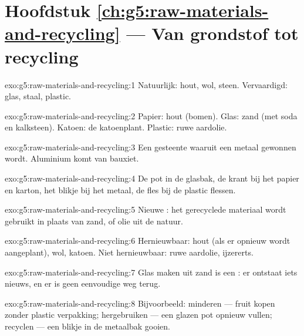 \section*{Hoofdstuk \ref{ch:g5:raw-materials-and-recycling} --- Van grondstof tot recycling}

\begin{solution}{exo:g5:raw-materials-and-recycling:1}
Natuurlijk: hout, wol, steen. Vervaardigd: glas, staal, plastic.
\end{solution}

\begin{solution}{exo:g5:raw-materials-and-recycling:2}
Papier: hout (bomen). Glas: zand (met soda en kalksteen). Katoen: de
katoenplant. Plastic: ruwe aardolie.
\end{solution}

\begin{solution}{exo:g5:raw-materials-and-recycling:3}
Een gesteente waaruit een metaal gewonnen wordt. Aluminium komt van
bauxiet.
\end{solution}

\begin{solution}{exo:g5:raw-materials-and-recycling:4}
De pot in de glasbak, de krant bij het papier en karton, het blikje bij
het metaal, de fles bij de plastic flessen.
\end{solution}

\begin{solution}{exo:g5:raw-materials-and-recycling:5}
Nieuwe : het gerecyclede materiaal wordt gebruikt in plaats van
zand,  of olie uit de natuur.
\end{solution}

\begin{solution}{exo:g5:raw-materials-and-recycling:6}
Hernieuwbaar: hout (als er opnieuw wordt aangeplant), wol, katoen. Niet
hernieuwbaar: ruwe aardolie, ijzererts.
\end{solution}

\begin{solution}{exo:g5:raw-materials-and-recycling:7}
Glas maken uit zand is een : er ontstaat iets
nieuws, en er is geen eenvoudige weg terug.
\end{solution}

\begin{solution}{exo:g5:raw-materials-and-recycling:8}
Bijvoorbeeld: minderen --- fruit kopen zonder plastic verpakking;
hergebruiken --- een glazen pot opnieuw vullen; recyclen --- een blikje
in de metaalbak gooien.
\end{solution}

